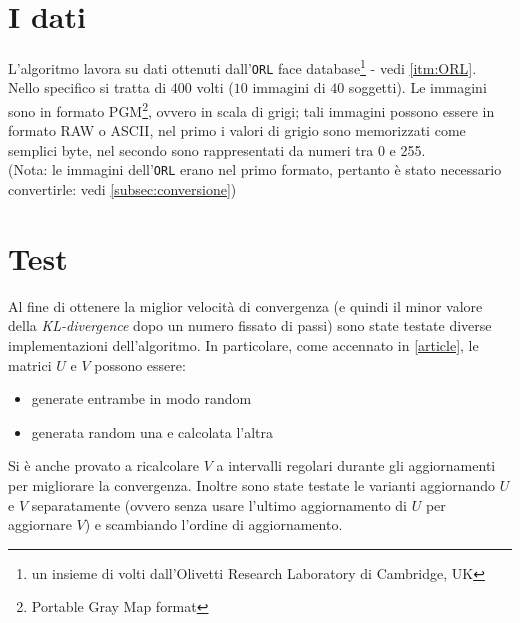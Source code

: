 \documentclass[a4paper]{article} %
\begin{document}
\section{I dati}
L'algoritmo lavora su dati ottenuti dall'\texttt{ORL} face database\footnote{un insieme di volti dall'Olivetti Research Laboratory di Cambridge, UK} - vedi \ref{itm:ORL}.
Nello specifico si tratta di $400$ volti ($10$ immagini di $40$ soggetti). Le immagini sono in formato PGM\footnote{Portable Gray Map format}, ovvero in scala di grigi; tali immagini possono essere in formato RAW o ASCII, nel primo i valori di grigio sono memorizzati come semplici byte, nel secondo sono rappresentati da numeri tra 0 e 255. \\ 
(Nota: le immagini dell'\texttt{ORL} erano nel primo formato, pertanto è stato necessario convertirle: vedi \ref{subsec:conversione})

\section{Test}
Al fine di ottenere la miglior velocità di convergenza (e quindi il minor valore della \emph{KL-divergence} dopo un numero fissato di passi) sono state testate diverse implementazioni dell'algoritmo. In particolare, come accennato in \ref{article}, le matrici $U$ e $V$ possono essere:
\begin{itemize}
\item generate entrambe in modo random
\item generata random una e calcolata l'altra
\end{itemize}
Si è anche provato a ricalcolare $V$ a intervalli regolari durante gli aggiornamenti per migliorare la convergenza.
Inoltre sono state testate le varianti aggiornando $U$ e $V$ separatamente (ovvero senza usare l'ultimo aggiornamento di $U$ per aggiornare $V$) e scambiando l'ordine di aggiornamento.

\newpage
\end{document}
